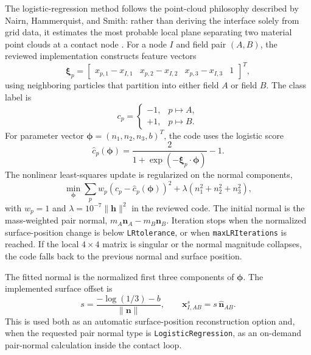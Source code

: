 The logistic-regression method follows the point-cloud philosophy described by Nairn, Hammerquist, and Smith: rather than deriving the interface solely from grid data, it estimates the most probable local plane separating two material point clouds at a contact node \cite{nairn2020contact}.  For a node $I$ and field pair $(A,B)$, the reviewed implementation constructs feature vectors
\begin{equation}
  \boldsymbol{\xi}_p=\begin{bmatrix}
  x_{p,1}-x_{I,1} & x_{p,2}-x_{I,2} & x_{p,3}-x_{I,3} & 1
  \end{bmatrix}^{T},
\end{equation}
using neighboring particles that partition into either field $A$ or field $B$.  The class label is
\begin{equation}
  c_p=\begin{cases}
  -1, & p\mapsto A,\\
  +1, & p\mapsto B.
  \end{cases}
\end{equation}
For parameter vector $\boldsymbol{\phi}=(n_1,n_2,n_3,b)^T$, the code uses the logistic score
\begin{equation}
  \widehat{c}_p(\boldsymbol{\phi})=\frac{2}{1+\exp(-\boldsymbol{\xi}_p\cdot\boldsymbol{\phi})}-1.
\end{equation}
The nonlinear least-squares update is regularized on the normal components,
\begin{equation}
  \min_{\boldsymbol{\phi}}
  \sum_{p} w_p\left(c_p-\widehat{c}_p(\boldsymbol{\phi})\right)^2
  +\lambda\left(n_1^2+n_2^2+n_3^2\right),
  \label{eq:contact-logistic-objective}
\end{equation}
with $w_p=1$ and $\lambda=10^{-7}\|\mathbf{h}\|^2$ in the reviewed code.  The initial normal is the mass-weighted pair normal, $m_A\mathbf{n}_A-m_B\mathbf{n}_B$.  Iteration stops when the normalized surface-position change is below \texttt{LRtolerance}, or when \texttt{maxLRIterations} is reached.  If the local $4\times4$ matrix is singular or the normal magnitude collapses, the code falls back to the previous normal and surface position.

The fitted normal is the normalized first three components of $\boldsymbol{\phi}$.  The implemented surface offset is
\begin{equation}
  s=\frac{-\log(1/3)-b}{\|\mathbf{n}\|},
  \qquad
  \mathbf{x}^{s}_{I,AB}=s\,\hat{\mathbf{n}}_{AB}.
  \label{eq:contact-lr-offset}
\end{equation}
This is used both as an automatic surface-position reconstruction option and, when the requested pair normal type is \texttt{LogisticRegression}, as an on-demand pair-normal calculation inside the contact loop.

